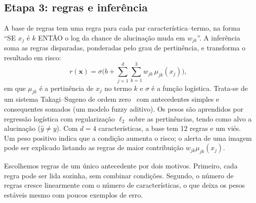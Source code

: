 \subsection{Etapa 3: regras e inferência}
A base de regras tem uma regra para cada par característica--termo, na forma ``SE $x_j$ é $k$ ENTÃO o log da chance de alucinação muda em
$w_{jk}$''. A inferência soma as regras disparadas, ponderadas pelo grau de pertinência, e transforma o resultado em risco:
\begin{equation}
  r(\mathbf{x}) = \sigma\Big(b + \sum_{j=1}^{d}\sum_{k=1}^{3} w_{jk}\,\mu_{jk}(x_j)\Big),
  \label{eq:aditivo}
\end{equation}
em que $\mu_{jk}$ é a pertinência de $x_j$ no termo $k$ e $\sigma$ é a função logística. Trata-se de um sistema Takagi--Sugeno de ordem
zero~\cite{takagi1985} com antecedentes simples e consequentes somados (um modelo fuzzy aditivo). Os pesos são aprendidos por regressão
logística com regularização $\ell_2$ sobre as pertinências, tendo como alvo a alucinação ($\hat y \ne y$). Com $d=4$ características, a
base tem 12 regras e um viés. Um peso positivo indica que a condição aumenta o risco; o alerta de uma imagem pode ser explicado listando as
regras de maior contribuição $w_{jk}\mu_{jk}(x_j)$.

Escolhemos regras de um único antecedente por dois motivos. Primeiro, cada regra pode ser lida sozinha, sem combinar condições. Segundo,
o número de regras cresce linearmente com o número de características, o que deixa os pesos estáveis mesmo com poucos exemplos de erro.

